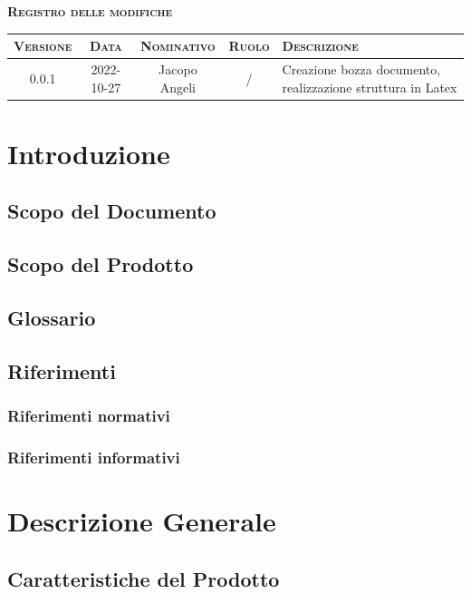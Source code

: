 \documentclass[12pt]{article}
\begin{document}
\newpage

\Large\textbf{\textsc{Registro delle modifiche}}
\newline

\large
\noindent
\begin{tabularx}{\hsize}{c|c|c|c|X}
\hline
\textbf{\textsc{Versione}} & \textbf{\textsc{Data}} & \textbf{\textsc{Nominativo}} & \textbf{\textsc{Ruolo}} & \textbf{\textsc{Descrizione}} \\
\hline
    0.0.1   &   2022-10-27  &   Jacopo Angeli   &   /   &   Creazione bozza documento, realizzazione                                                         struttura in Latex \\
\end{tabularx}

\newpage

\tableofcontents

\newpage

\section{Introduzione}
\subsection{Scopo del Documento}
\subsection{Scopo del Prodotto}
\subsection{Glossario}
\subsection{Riferimenti}
\subsubsection{Riferimenti normativi}
\subsubsection{Riferimenti informativi}

\section{Descrizione Generale}
\subsection{Caratteristiche del Prodotto}
\end{document}
